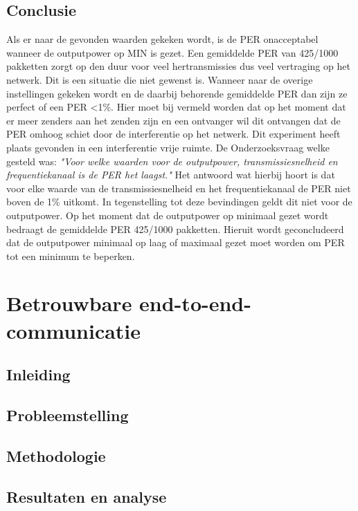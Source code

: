 \documentclass{article}
\begin{document}
\subsection{Conclusie}
Als er naar de gevonden waarden gekeken wordt, is de PER onacceptabel wanneer de outputpower op MIN is gezet. Een gemiddelde PER van 425/1000 pakketten zorgt op den duur voor veel hertransmissies dus veel vertraging op het netwerk. Dit is een situatie die niet gewenst is. Wanneer naar de overige instellingen gekeken wordt en de daarbij behorende gemiddelde PER dan zijn ze perfect of een PER <1\%. Hier moet bij vermeld worden dat op het moment dat er meer zenders aan het zenden zijn en een ontvanger wil dit ontvangen dat de PER omhoog schiet door de interferentie op het netwerk. Dit experiment heeft plaats gevonden in een interferentie vrije ruimte.
De Onderzoeksvraag welke gesteld was: \textit{"Voor welke waarden voor de outputpower, transmissiesnelheid en frequentiekanaal is de PER het laagst."} Het antwoord wat hierbij hoort is dat voor elke waarde van de transmissiesnelheid en het frequentiekanaal de PER niet boven de 1\% uitkomt. In tegenstelling tot deze bevindingen geldt dit niet voor de outputpower. Op het moment dat de outputpower op minimaal gezet wordt bedraagt de gemiddelde PER 425/1000 pakketten. Hieruit wordt geconcludeerd dat de outputpower minimaal op laag of maximaal gezet moet worden om PER tot een minimum te beperken. 

\newpage

\clearpage
\section{Betrouwbare end-to-end-communicatie}
\subsection{Inleiding}
\subsection{Probleemstelling}
\subsection{Methodologie}
\subsection{Resultaten en analyse}
\clearpage
\appendix
\end{document}
